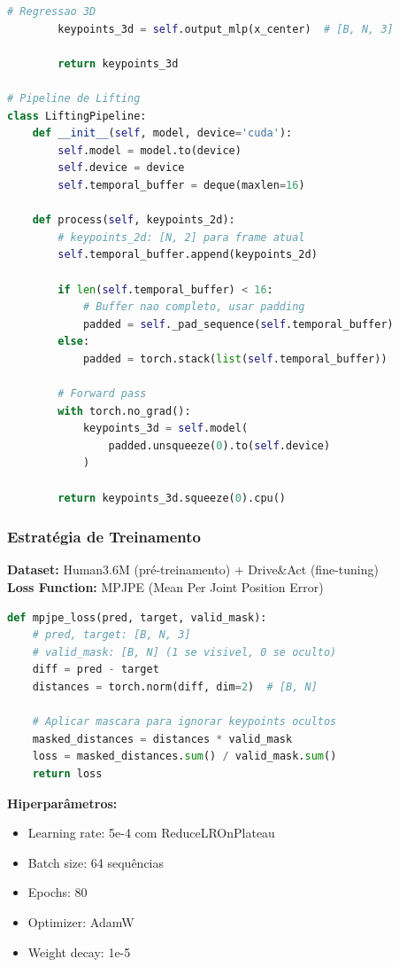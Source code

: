 \documentclass[12pt, a4paper]{article}
\begin{document}
\begin{lstlisting}[language=Python, caption=Módulo 3 - Lifting 3D]
        # Regressao 3D
        keypoints_3d = self.output_mlp(x_center)  # [B, N, 3]
        
        return keypoints_3d

# Pipeline de Lifting
class LiftingPipeline:
    def __init__(self, model, device='cuda'):
        self.model = model.to(device)
        self.device = device
        self.temporal_buffer = deque(maxlen=16)
        
    def process(self, keypoints_2d):
        # keypoints_2d: [N, 2] para frame atual
        self.temporal_buffer.append(keypoints_2d)
        
        if len(self.temporal_buffer) < 16:
            # Buffer nao completo, usar padding
            padded = self._pad_sequence(self.temporal_buffer)
        else:
            padded = torch.stack(list(self.temporal_buffer))
        
        # Forward pass
        with torch.no_grad():
            keypoints_3d = self.model(
                padded.unsqueeze(0).to(self.device)
            )
        
        return keypoints_3d.squeeze(0).cpu()
\end{lstlisting}

\subsubsection{Estratégia de Treinamento}

\textbf{Dataset:} Human3.6M (pré-treinamento) + Drive\&Act (fine-tuning)\\
\textbf{Loss Function:} MPJPE (Mean Per Joint Position Error)
\begin{lstlisting}[language=Python]
def mpjpe_loss(pred, target, valid_mask):
    # pred, target: [B, N, 3]
    # valid_mask: [B, N] (1 se visivel, 0 se oculto)
    diff = pred - target
    distances = torch.norm(diff, dim=2)  # [B, N]
    
    # Aplicar mascara para ignorar keypoints ocultos
    masked_distances = distances * valid_mask
    loss = masked_distances.sum() / valid_mask.sum()
    return loss
\end{lstlisting}

\textbf{Hiperparâmetros:}
\begin{itemize}
    \item Learning rate: 5e-4 com ReduceLROnPlateau
    \item Batch size: 64 sequências
    \item Epochs: 80
    \item Optimizer: AdamW
    \item Weight decay: 1e-5
\end{itemize}
\end{document}
